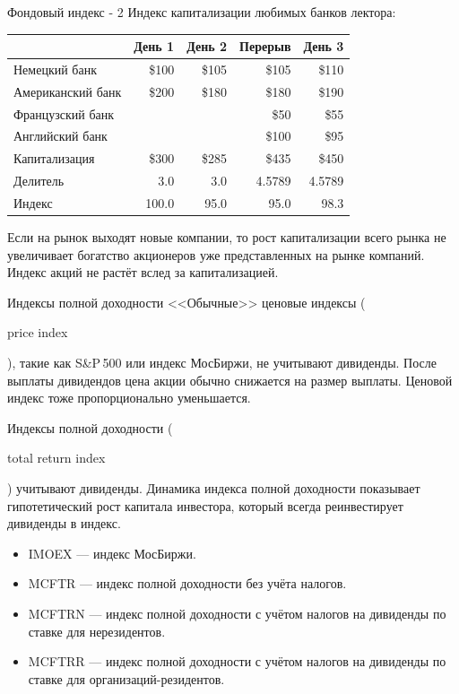 \documentclass{beamer}
\newcommand{\en}[1]{\begin{otherlanguage}{english}#1\end{otherlanguage}}
\begin{document}
\begin{frame}{Фондовый индекс - 2}
\justify
Индекс капитализации любимых банков лектора:

\justify
\centering
\begin{tabular}{l|r|r|r|r}
                  & День 1 & День 2 & Перерыв & День 3 \\ \hline
Немецкий банк     & \$100  & \$105  & \$105   & \$110 \\
Американский банк & \$200  & \$180  & \$180   & \$190 \\
Французский банк  &        &        & \$50    & \$55  \\
Английский банк   &        &        & \$100   & \$95  \\ \hline
Капитализация     & \$300  & \$285  & \$435   & \$450 \\
Делитель          & 3.0    & 3.0    & 4.5789  & 4.5789 \\ \hline
Индекс            & 100.0  & 95.0   & 95.0    & 98.3
\end{tabular}

\justify
Если на рынок выходят новые компании, то рост капитализации всего рынка не 
увеличивает богатство акционеров уже представленных на рынке компаний. Индекс 
акций не растёт вслед за капитализацией.
\end{frame}



\begin{frame}{Индексы полной доходности}
\justify
<<Обычные>> ценовые индексы (\en{price index}), такие как S\&P\,500 или индекс 
МосБиржи, не учитывают дивиденды. После выплаты дивидендов цена акции обычно 
снижается на размер выплаты. Ценовой индекс тоже пропорционально уменьшается.

\justify
Индексы полной доходности (\en{total return index}) учитывают дивиденды. 
Динамика индекса полной доходности показывает гипотетический рост капитала 
инвестора, который всегда реинвестирует дивиденды в индекс.

\justify
\begin{itemize}
\item IMOEX --- индекс МосБиржи.
\item MCFTR --- индекс полной доходности без учёта налогов.
\item MCFTRN --- индекс полной доходности с учётом налогов на дивиденды по 
ставке для нерезидентов.
\item MCFTRR --- индекс полной доходности с учётом налогов на дивиденды по
ставке для организаций-резидентов.
\end{itemize}
\end{frame}
\end{document}
